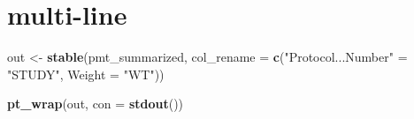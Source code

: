 \documentclass[
]{article}
\newenvironment{Shaded}{\begin{snugshade}}{\end{snugshade}}
\newcommand{\ControlFlowTok}[1]{\textcolor[rgb]{0.13,0.29,0.53}{\textbf{#1}}}
\newcommand{\DataTypeTok}[1]{\textcolor[rgb]{0.13,0.29,0.53}{#1}}
\newcommand{\KeywordTok}[1]{\textcolor[rgb]{0.13,0.29,0.53}{\textbf{#1}}}
\newcommand{\NormalTok}[1]{#1}
\newcommand{\OperatorTok}[1]{\textcolor[rgb]{0.81,0.36,0.00}{\textbf{#1}}}
\newcommand{\StringTok}[1]{\textcolor[rgb]{0.31,0.60,0.02}{#1}}
\begin{document}
\begin{Shaded}
\end{Shaded}

\clearpage

\hypertarget{multi-line}{%
\section{multi-line}\label{multi-line}}

\begin{Shaded}
\begin{Highlighting}[]
\NormalTok{out <-}\StringTok{ }\KeywordTok{stable}\NormalTok{(pmt_summarized, }\DataTypeTok{col_rename =} \KeywordTok{c}\NormalTok{(}\StringTok{"Protocol...Number"}\NormalTok{ =}\StringTok{ "STUDY"}\NormalTok{, }\DataTypeTok{Weight =} \StringTok{"WT"}\NormalTok{))}

\KeywordTok{pt_wrap}\NormalTok{(out, }\DataTypeTok{con =} \KeywordTok{stdout}\NormalTok{()) }
\end{Highlighting}
\end{Shaded}
\end{document}
